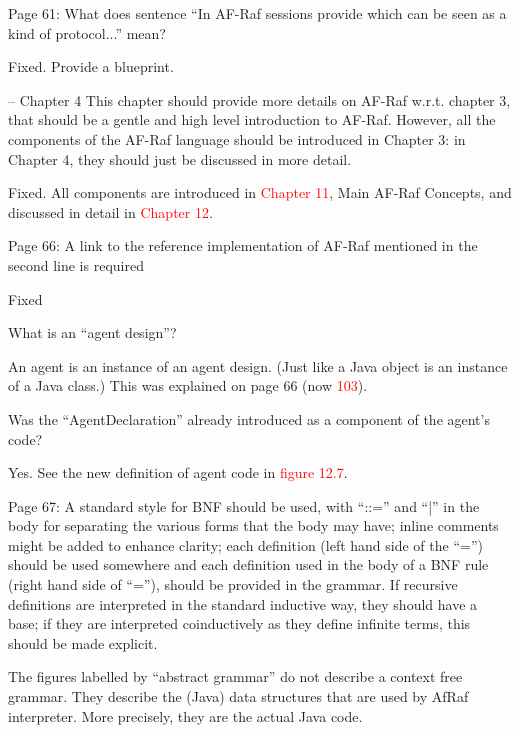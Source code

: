 \documentclass{article}
\newcommand*\R[1]{\textcolor{red}{#1}} %
\newenvironment{them}{\noindent\begingroup\color{blue}}{\endgroup\par}
\begin{document}
\begin{them}

Page 61:
What does sentence ``In AF-Raf sessions provide which can be seen as a kind of
protocol...'' mean?

\end{them}
Fixed. Provide a blueprint.

\begin{them}

-- Chapter 4
This chapter should provide more details on AF-Raf w.r.t. chapter 3, that
should be a gentle and high level introduction to AF-Raf. However, all the
components of the AF-Raf language should be introduced in Chapter 3: in Chapter
4, they should just be discussed in more detail.

\end{them}
Fixed. All components are introduced in \R{Chapter 11}, Main AF-Raf Concepts, and discussed in detail in \R{Chapter 12}.

\begin{them}

Page 66:
A link to the reference implementation of AF-Raf mentioned in the second line
is required

\end{them}
Fixed

\begin{them}

What is an ``agent design''? 

\end{them}

An agent is an instance of an agent design.
(Just like a Java object is an instance of a Java class.)
This was explained on page 66 (now \R{103}).

\begin{them}

Was the ``AgentDeclaration'' already introduced as a component of the agent's
code?

\end{them}
Yes. See the new definition of agent code in \R{figure 12.7}.

\begin{them}

Page 67:
A standard style for BNF should be used, with ``::='' and ``|'' in the body for
separating the various forms that the body may have; inline comments might be
added to enhance clarity; each definition (left hand side of the ``='') should be
used somewhere and each definition used in the body of a BNF rule (right hand
side of ``=''), should be provided in the grammar. If recursive definitions are
interpreted in the standard inductive way, they should have a base; if they are
interpreted coinductively as they define infinite terms, this should be made
explicit. 

\end{them}
The figures labelled by ``abstract grammar'' do not describe a context free
grammar. They describe the (Java) data structures that are used by AfRaf
interpreter. More precisely, they are the actual Java code.
\end{document}

